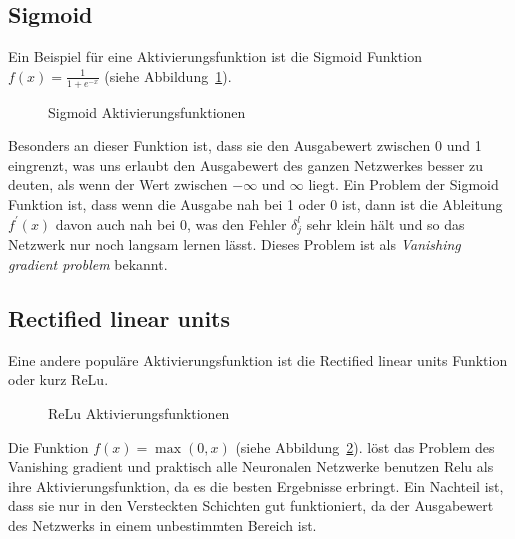 \documentclass[12pt,a4paper]{report}
\begin{document}
\subsection{Sigmoid}
Ein Beispiel für eine Aktivierungsfunktion ist die Sigmoid Funktion $f(x) = \frac{1}{1 + e^{-x}}$ (siehe Abbildung~\ref{fig:activation1}).
\begin{figure}[h]
    \centering
{}
    \caption{Sigmoid Aktivierungsfunktionen}
    \label{fig:activation1}
\end{figure}
Besonders an dieser Funktion ist, dass sie den Ausgabewert zwischen 0 und 1 eingrenzt, was uns erlaubt den Ausgabewert des ganzen
Netzwerkes besser zu deuten, als wenn der Wert zwischen $-\infty$ und $\infty$ liegt.
Ein Problem der Sigmoid Funktion ist, dass wenn die Ausgabe nah bei 1 oder 0 ist, dann ist die Ableitung $f^\prime(x)$ davon auch nah bei 0,
was den Fehler $\delta^l_j$ sehr klein hält und so das Netzwerk nur noch langsam lernen lässt.
Dieses Problem ist als \textit{Vanishing gradient problem} bekannt.
\subsection{Rectified linear units}
Eine andere populäre Aktivierungsfunktion ist die Rectified linear units Funktion oder kurz ReLu.
\begin{figure}[h]
    \centering
{}
    \caption{ReLu Aktivierungsfunktionen}
    \label{fig:activation2}
\end{figure}
Die Funktion $f(x) = \max(0, x)$ (siehe Abbildung~\ref{fig:activation2}).
löst das Problem des Vanishing gradient und praktisch alle Neuronalen Netzwerke benutzen Relu als ihre Aktivierungsfunktion,
da es die besten Ergebnisse erbringt.\cite{activations}
Ein Nachteil ist, dass sie nur in den Versteckten Schichten gut funktioniert,
da der Ausgabewert des Netzwerks in einem unbestimmten Bereich ist.
\end{document}
